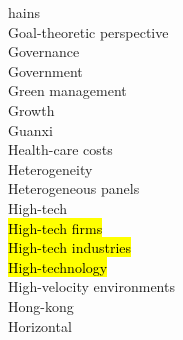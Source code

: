 \documentclass[a4paper]{article}
\begin{document}
\begin{multicols*}{2}
\begin{footnotesize}
hains \\ Goal-theoretic perspective \\ Governance \\ Government \\ Green management \\ Growth \\ Guanxi \\ Health-care costs \\ Heterogeneity \\ Heterogeneous panels \\ High-tech \\ \hl{High-tech firms} \\ \hl{High-tech industries} \\ \hl{High-technology} \\ High-velocity environments \\ Hong-kong \\ Horizontal 
\end{footnotesize}
\end{multicols*}
\end{document}
